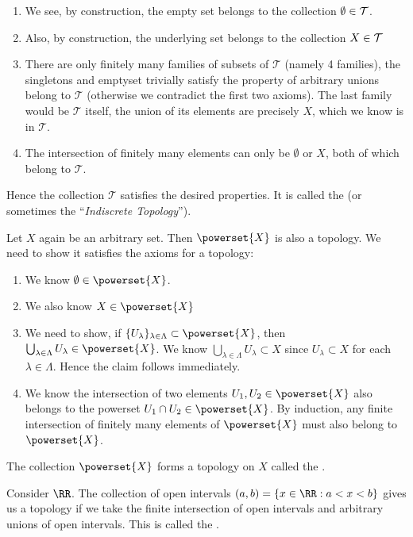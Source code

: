 \begin{enumerate}
  \item We see, by construction, the empty set belongs to the collection
    $\emptyset\in\mathcal{T}$.
  \item Also, by construction, the underlying set belongs to the
    collection $X\in\mathcal{T}$
  \item There are only finitely many families of subsets of
    $\mathcal{T}$ (namely 4 families), the singletons and emptyset
    trivially satisfy the property of arbitrary unions belong to
    $\mathcal{T}$ (otherwise we contradict the first two axioms). The
    last family would be $\mathcal{T}$ itself, the union of its elements
    are precisely $X$, which we know is in $\mathcal{T}$.
  \item The intersection of finitely many elements can only be
    $\emptyset$ or $X$, both of which belong to $\mathcal{T}$.
\end{enumerate}

Hence the collection $\mathcal{T}$ satisfies the desired properties. It
is called the  (or sometimes the
``\emph{Indiscrete Topology}'').

Let $X$ again be an arbitrary set. Then $\powerset{X}$ is also a topology.
We need to show it satisfies the axioms for a topology:

\begin{enumerate}
\item We know $\emptyset\in\powerset{X}$.
\item We also know $X\in\powerset{X}$
\item We need to show, if
  $\{U_{\lambda}\}_{\lambda\in\Lambda}\subset\powerset{X}$, then
  $\bigcup_{\lambda\in\Lambda}U_{\lambda}\in\powerset{X}$. We know
  $\bigcup_{\lambda\in\Lambda}U_{\lambda}\subset X$ since
  $U_{\lambda}\subset X$ for each $\lambda\in\Lambda$. Hence the claim
  follows immediately.
\item We know the intersection of two elements
  $U_{1},U_{2}\in\powerset{X}$ also belongs to the powerset $U_{1}\cap
  U_{2}\in\powerset{X}$. By induction, any finite intersection of
  finitely many elements of $\powerset{X}$ must also belong to
  $\powerset{X}$. 
\end{enumerate}

The collection $\powerset{X}$ forms a topology on $X$ called the
.

Consider $\RR$. The collection of open intervals $(a,b)=\{x\in\RR : a<
x<b\}$ gives us a topology if we take the finite intersection of open
intervals and arbitrary unions of open intervals. This is called the
.

